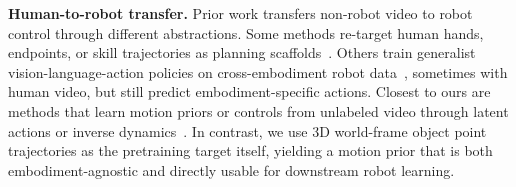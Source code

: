 \noindent\textbf{Human-to-robot transfer.}
Prior work transfers non-robot video to robot control through different abstractions. Some methods re-target human hands, endpoints, or skill trajectories as planning scaffolds~\cite{bahl2023affordances, vidbot,fang2026molmoact2, traj2action, bharadhwaj2024gen2act, li2025h2r}. Others train generalist vision-language-action policies on cross-embodiment robot data~\cite{bousmalis2023robocat, padalkar2024openx, octo2024, openvla, pi0}, sometimes with human video, but still predict embodiment-specific actions. Closest to ours are methods that learn motion priors or controls from unlabeled video through latent actions or inverse dynamics~\cite{bahl2023swim, dexwm, latentactionwild, lapa, egovla}. In contrast, we use 3D world-frame object point trajectories as the pretraining target itself, yielding a motion prior that is both embodiment-agnostic and directly usable for downstream robot learning.


